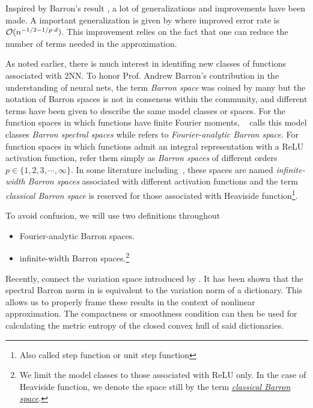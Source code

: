 
Inspired by Barron's result \citep{eRepresentationFormulasPointwise2020,
carageaNeuralNetworkApproximation2022}, a lot of generalizations and
improvements have been made. A important generalization is given by
\cite{makovozRandomApproximantsNeural1996} where improved error rate is
$\mathcal{O}(n^{-1/2-1 / p\cdot d})$. This improvement relies on the fact that one can
reduce the number of terms needed in the approximation. 

As noted earlier, there is much interest in identifing new classes of functions
associated with 2NN. To honor Prof. Andrew Barron's contribution in the
understanding of neural nets, the term \textit{Barron space} was coined by many
but the notation of Barron spaces is not in consensus within the community, and
different terms have been given to describe the same model classes or spaces.
For the function spaces in which functions have finite Fourier moments,
~\cite{xuFiniteNeuronMethod2020} calls this model classes \textit{Barron
spectral spaces} while \cite{carageaNeuralNetworkApproximation2022} refers to
\textit{Fourier-analytic Barron space}.  For function spaces in which functions
admit an integral representation with a ReLU activation function,
\cite{eBarronSpaceFlowinduced2021} refer them simply as \textit{Barron spaces}
of different orders $p \in \{1, 2, 3, \cdots, \infty\}$. In some literature
including~\cite{carageaNeuralNetworkApproximation2022}, these spaces are named
\textit{infinite-width Barron spaces} associated with different activation
functions and the term \textit{classical Barron space} is reserved for those
associated with Heaviside function\footnote{Also called step function or unit
step function}.

To avoid confusion, we will use two definitions throughout
\begin{itemize}
    \item Fourier-analytic Barron spaces.
    \item infinite-width Barron spaces.\footnote{
        We limit the model classes to those associated with ReLU only. In the 
        case of Heaviside function, we denote the space still by the term 
        \hyperref[def:heaviside_space]{\textit{classical Barron space}}.
    }
\end{itemize}

Recently, \cite{siegelCharacterizationVariationSpaces2022} connect the variation
space introduced by \cite{parhiBanachSpaceRepresenter2021,
parhiWhatKindsFunctions2022}. It has been shown that the spectral Barron norm in
is equivalent to the variation norm of a dictionary. This allows us to properly
frame these results in the context of nonlinear approximation. The compactness
or smoothness condition can then be used for calculating the metric entropy of
the closed convex hull of said dictionaries.

